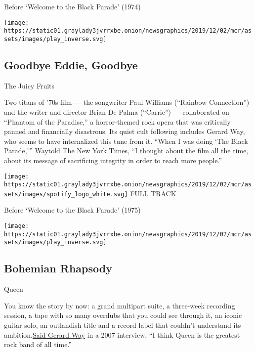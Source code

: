 Before `Welcome to the Black Parade' (1974)

\texttt{[image: https://static01.graylady3jvrrxbe.onion/newsgraphics/2019/12/02/mcr/assets/images/play\_inverse.svg]}

\hypertarget{goodbye-eddie-goodbye}{%
\subsection{Goodbye Eddie, Goodbye}\label{goodbye-eddie-goodbye}}

The Juicy Fruits

Two titans of '70s film --- the songwriter Paul Williams (``Rainbow
Connection'') and the writer and director Brian De Palma (``Carrie'')
--- collaborated on ``Phantom of the Paradise,'' a horror-themed rock
opera that was critically panned and financially disastrous. Its quiet
cult following includes Gerard Way, who seems to have internalized this
tune from it. ``When I was doing `The Black Parade,'''
Way\href{https://www.nytimes3xbfgragh.onion/2014/08/24/movies/homevideo/phantom-of-the-paradise-rereleased-on-disc.html}{}\href{https://www.nytimes3xbfgragh.onion/2014/08/24/movies/homevideo/phantom-of-the-paradise-rereleased-on-disc.html}{told
The New York Times}, ``I thought about the film all the time, about its
message of sacrificing integrity in order to reach more people.''

\href{https://open.spotify.com/track/4Yn8KdQlotvBuLC5tG1m4K?si=lTOqcI2oR4mlLNuzlasD9g}{}

\texttt{[image: https://static01.graylady3jvrrxbe.onion/newsgraphics/2019/12/02/mcr/assets/images/spotify\_logo\_white.svg]}
FULL TRACK

Before `Welcome to the Black Parade' (1975)

\texttt{[image: https://static01.graylady3jvrrxbe.onion/newsgraphics/2019/12/02/mcr/assets/images/play\_inverse.svg]}

\hypertarget{bohemian-rhapsody}{%
\subsection{Bohemian Rhapsody}\label{bohemian-rhapsody}}

Queen

You know the story by now: a grand multipart suite, a three-week
recording session, a tape with so many overdubs that you could see
through it, an iconic guitar solo, an outlandish title and a record
label that couldn't understand its
ambition.\href{https://books.google.com/books?id=nN-fDAAAQBAJ\&lpg=PT20\&ots=9L3SE3lA0H\&dq=\%22I\%20think\%20Queen\%20is\%20the\%20greatest\%20rock\%20band\%20of\%20all\%20time\%22\&pg=PT20\#v=onepage\&q=\%22I\%20think\%20Queen\%20is\%20the\%20greatest\%20rock\%20band\%20of\%20all\%20time\%22\&f=false}{}\href{https://books.google.com/books?id=nN-fDAAAQBAJ\&lpg=PT20\&ots=9L3SE3lA0H\&dq=\%22I\%20think\%20Queen\%20is\%20the\%20greatest\%20rock\%20band\%20of\%20all\%20time\%22\&pg=PT20\#v=onepage\&q=\%22I\%20think\%20Queen\%20is\%20the\%20greatest\%20rock\%20band\%20of\%20all\%20time\%22\&f=false}{Said
Gerard Way} in a 2007 interview, ``I think Queen is the greatest rock
band of all time.''

